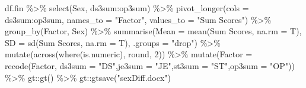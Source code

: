 \documentclass[
  letterpaper,
  DIV=11,
  numbers=noendperiod]{scrartcl}
\newenvironment{Shaded}{\begin{snugshade}}{\end{snugshade}}
\newcommand{\AttributeTok}[1]{\textcolor[rgb]{0.40,0.45,0.13}{#1}}
\newcommand{\DecValTok}[1]{\textcolor[rgb]{0.68,0.00,0.00}{#1}}
\newcommand{\FunctionTok}[1]{\textcolor[rgb]{0.28,0.35,0.67}{#1}}
\newcommand{\NormalTok}[1]{\textcolor[rgb]{0.00,0.23,0.31}{#1}}
\newcommand{\SpecialCharTok}[1]{\textcolor[rgb]{0.37,0.37,0.37}{#1}}
\newcommand{\StringTok}[1]{\textcolor[rgb]{0.13,0.47,0.30}{#1}}
\begin{document}
\begin{Shaded}
\begin{Highlighting}[]
\NormalTok{df.fin }\SpecialCharTok{\%\textgreater{}\%}
  \FunctionTok{select}\NormalTok{(Sex, ds3sum}\SpecialCharTok{:}\NormalTok{op3sum) }\SpecialCharTok{\%\textgreater{}\%}
  \FunctionTok{pivot\_longer}\NormalTok{(}\AttributeTok{cols =}\NormalTok{ ds3sum}\SpecialCharTok{:}\NormalTok{op3sum, }\AttributeTok{names\_to =} \StringTok{"Factor"}\NormalTok{, }\AttributeTok{values\_to =} \StringTok{"Sum Scores"}\NormalTok{) }\SpecialCharTok{\%\textgreater{}\%}
  \FunctionTok{group\_by}\NormalTok{(Factor, Sex) }\SpecialCharTok{\%\textgreater{}\%}
  \FunctionTok{summarise}\NormalTok{(}\AttributeTok{Mean =} \FunctionTok{mean}\NormalTok{(}\StringTok{\textasciigrave{}}\AttributeTok{Sum Scores}\StringTok{\textasciigrave{}}\NormalTok{, }\AttributeTok{na.rm =}\NormalTok{ T), }\AttributeTok{SD =} \FunctionTok{sd}\NormalTok{(}\StringTok{\textasciigrave{}}\AttributeTok{Sum Scores}\StringTok{\textasciigrave{}}\NormalTok{, }\AttributeTok{na.rm =}\NormalTok{ T), }\AttributeTok{.groups =} \StringTok{"drop"}\NormalTok{) }\SpecialCharTok{\%\textgreater{}\%}
  \FunctionTok{mutate}\NormalTok{(}\FunctionTok{across}\NormalTok{(}\FunctionTok{where}\NormalTok{(is.numeric), round, }\DecValTok{2}\NormalTok{)) }\SpecialCharTok{\%\textgreater{}\%}
  \FunctionTok{mutate}\NormalTok{(}\AttributeTok{Factor =} \FunctionTok{recode}\NormalTok{(Factor, }\AttributeTok{ds3sum =} \StringTok{"DS"}\NormalTok{,}\AttributeTok{je3sum =} \StringTok{"JE"}\NormalTok{,}\AttributeTok{st3sum =} \StringTok{"ST"}\NormalTok{,}\AttributeTok{op3sum =} \StringTok{"OP"}\NormalTok{)) }\SpecialCharTok{\%\textgreater{}\%}
\NormalTok{  gt}\SpecialCharTok{::}\FunctionTok{gt}\NormalTok{() }\SpecialCharTok{\%\textgreater{}\%}
\NormalTok{  gt}\SpecialCharTok{::}\FunctionTok{gtsave}\NormalTok{(}\StringTok{"sexDiff.docx"}\NormalTok{)}


\end{Highlighting}
\end{Shaded}
\end{document}
